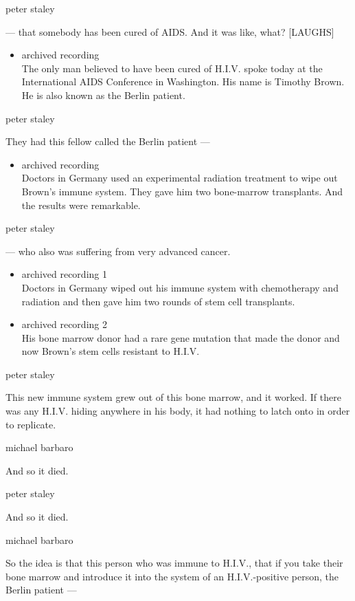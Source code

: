 peter staley

--- that somebody has been cured of AIDS. And it was like, what?
{[}LAUGHS{]}

\begin{itemize}
\tightlist
\item
  archived recording\\
  The only man believed to have been cured of H.I.V. spoke today at the
  International AIDS Conference in Washington. His name is Timothy
  Brown. He is also known as the Berlin patient.
\end{itemize}

peter staley

They had this fellow called the Berlin patient ---

\begin{itemize}
\tightlist
\item
  archived recording\\
  Doctors in Germany used an experimental radiation treatment to wipe
  out Brown's immune system. They gave him two bone-marrow transplants.
  And the results were remarkable.
\end{itemize}

peter staley

--- who also was suffering from very advanced cancer.

\begin{itemize}
\item
  archived recording 1\\
  Doctors in Germany wiped out his immune system with chemotherapy and
  radiation and then gave him two rounds of stem cell transplants.
\item
  archived recording 2\\
  His bone marrow donor had a rare gene mutation that made the donor and
  now Brown's stem cells resistant to H.I.V.
\end{itemize}

peter staley

This new immune system grew out of this bone marrow, and it worked. If
there was any H.I.V. hiding anywhere in his body, it had nothing to
latch onto in order to replicate.

michael barbaro

And so it died.

peter staley

And so it died.

michael barbaro

So the idea is that this person who was immune to H.I.V., that if you
take their bone marrow and introduce it into the system of an
H.I.V.-positive person, the Berlin patient ---

